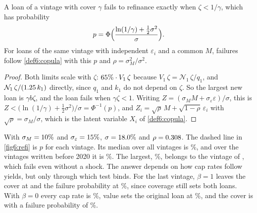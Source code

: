 \begin{chapterrefs}
\begin{proposition}\label{prop6:refi}
A loan of a vintage with cover $\gamma$ fails to refinance exactly when $\zeta<1/\gamma$, which has
probability
\[
  p=\Phi\Bigl(\frac{\ln(1/\gamma)+\tfrac12\sigma^2}{\sigma}\Bigr).
\]
For loans of the same vintage with independent $\varepsilon_i$ and a common $M$, failures follow
\cref{def6:copula} with this $p$ and $\rho=\sigma_M^2/\sigma^2$.
\end{proposition}

\begin{proof}
Both limits scale with $\zeta$: $65\%\cdot V_1\,\zeta$ because $V_1\,\zeta=\mathcal N_1\,\zeta/q_1$, and
$\mathcal N_1\,\zeta/(1.25\,k_1)$ directly, since $q_1$ and $k_1$ do not depend on $\zeta$. So the largest new
loan is $\gamma b\zeta$, and the loan fails when $\gamma \zeta<1$. Writing
$Z=(\sigma_MM+\sigma_\varepsilon\varepsilon)/\sigma$, this is
$Z<\bigl(\ln(1/\gamma)+\tfrac12\sigma^2\bigr)/\sigma=\Phi^{-1}(p)$, and
$Z_i=\sqrt\rho\,M+\sqrt{1-\rho}\,\varepsilon_i$ with $\sqrt\rho=\sigma_M/\sigma$, which is the latent variable $X_i$ of \cref{def6:copula}.
\end{proof}

With $\sigma_M=10\%$ and $\sigma_\varepsilon=15\%$, $\sigma=18.0\%$ and $\rho=0.308$. The
dashed line in \cref{fig6:refi} is $p$ for each vintage. Its median over all vintages is
\csPdMed\%, and over the vintages written before 2020 it is \csPdPreMed\%. The largest, \csPdMax\%,
belongs to the vintage of \csPdMaxDate, which fails even without a shock. The answer depends on how
cap rates follow yields, but only through which test binds. For the last vintage, $\beta=1$ leaves the
cover at \csCoverBetaOne{} and the failure probability at \csPdBetaOne\%, since coverage still sets
both loans. With $\beta=0$ every cap rate is \csCap\%, value sets the original loan at \csLtv\%, and
the cover is \csCoverBetaZero{} with a failure probability of \csPdBetaZero\%.


\end{chapterrefs}
